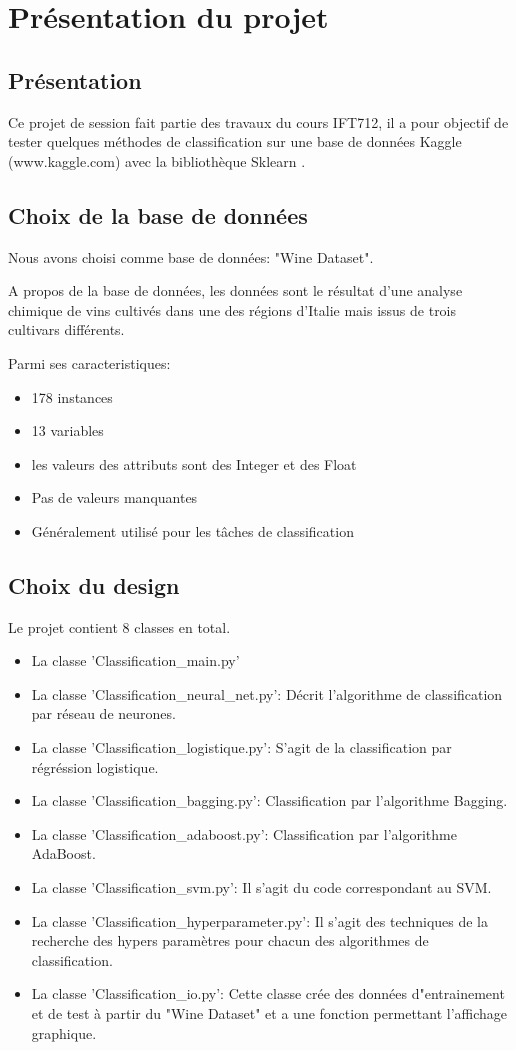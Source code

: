 \chapter{Présentation du projet}
\section{Présentation}
\par Ce projet de session fait partie des travaux du cours IFT712, il a pour objectif de tester quelques méthodes de classification sur une base de données
Kaggle (www.kaggle.com) avec la bibliothèque Sklearn .
\section{Choix de la base de données}
\par Nous avons choisi comme base de données: "Wine Dataset".
\par A propos de la base de données, les données sont le résultat d'une analyse chimique de vins cultivés dans une des régions d'Italie mais issus de trois cultivars différents.
\par Parmi ses caracteristiques:
\begin{itemize}[label=\textbullet]
    \item 178 instances
    \item 13 variables
    \item les valeurs des attributs sont des Integer et des Float
    \item Pas de valeurs manquantes
    \item Généralement utilisé pour les tâches de classification
\end{itemize}
\section{Choix du design}
\par Le projet contient 8 classes en total.
\begin{itemize}[label=\textbullet]
    \item La classe 'Classification\_main.py'
    \item La classe 'Classification\_neural\_net.py': Décrit l'algorithme de classification par réseau de neurones.
    \item La classe 'Classification\_logistique.py': S'agit de la classification par régréssion logistique.
    \item La classe 'Classification\_bagging.py': Classification par l'algorithme Bagging.
    \item La classe 'Classification\_adaboost.py': Classification par l'algorithme AdaBoost.
    \item La classe 'Classification\_svm.py': Il s'agit du code correspondant au SVM.
    \item La classe 'Classification\_hyperparameter.py': Il s'agit des techniques de la recherche des hypers paramètres pour chacun des algorithmes de classification.
    \item La classe 'Classification\_io.py': Cette classe crée des données d"entrainement et de test à partir du "Wine Dataset" et a une fonction permettant l'affichage graphique.
\end{itemize}
